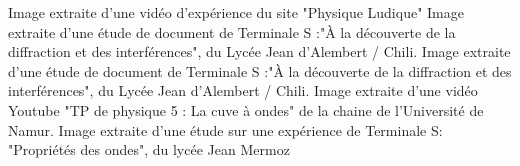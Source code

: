 \documentclass{report}
\begin{document}
\begin{thebibliography}{ab}
 Image extraite d'une vidéo d'expérience du site "Physique 
Ludique"
 Image extraite d'une étude de document de Terminale S :"À la découverte de la diffraction et des interférences", du Lycée Jean d’Alembert / Chili.
 Image extraite d'une étude de document de Terminale S :"À la découverte de la diffraction et des interférences", du Lycée Jean d’Alembert / Chili.
 Image extraite d'une vidéo Youtube "TP de physique 5 : La cuve à ondes" de la chaine de l'Université de Namur.
 Image extraite d'une étude sur une expérience de Terminale S: "Propriétés des ondes", du lycée Jean Mermoz

\end{thebibliography}
\end{document}
